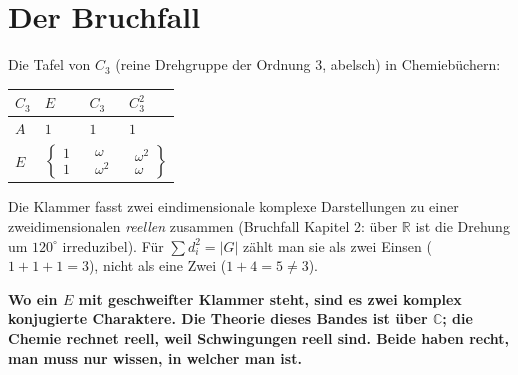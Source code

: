 \section{Der Bruchfall}

\begin{warnung}
Die Tafel von $C_3$ (reine Drehgruppe der Ordnung $3$, abelsch) in Chemiebüchern:
\begin{center}
{\small
\renewcommand{\arraystretch}{1.46}
\begin{tabular}{@{}P{1.0cm}P{0.7cm}P{1.0cm}P{1.0cm}@{}}
\toprule
$C_3$ & $E$ & $C_3$ & $C_3^{2}$\\
\midrule
$A$ & $1$ & $1$ & $1$\\
$E$ & $\left\{\begin{smallmatrix}1\\1\end{smallmatrix}\right.$ & $\begin{smallmatrix}\omega\\\omega^{2}\end{smallmatrix}$ & $\left.\begin{smallmatrix}\omega^{2}\\\omega\end{smallmatrix}\right\}$\\
\bottomrule
\end{tabular}}
\end{center}
Die Klammer fasst zwei eindimensionale komplexe Darstellungen zu einer zweidimensionalen \emph{reellen} zusammen (Bruchfall Kapitel 2: über $\mathbb R$ ist die Drehung um $120^{\circ}$ irreduzibel). Für $\sum d_i^{2} = |G|$ zählt man sie als zwei Einsen ($1 + 1 + 1 = 3$), nicht als eine Zwei ($1 + 4 = 5\neq3$).

\begin{center}
\begin{minipage}{0.9\textwidth}
\textbf{Wo ein $E$ mit geschweifter Klammer steht, sind es zwei komplex konjugierte Charaktere. Die Theorie dieses Bandes ist über $\mathbb C$; die Chemie rechnet reell, weil Schwingungen reell sind. Beide haben recht, man muss nur wissen, in welcher man ist.}
\end{minipage}
\end{center}


\end{warnung}
